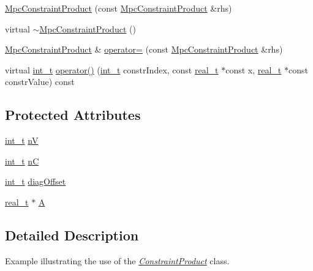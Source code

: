 \begin{DoxyCompactItemize}
\item 
\hyperlink{class_mpc_constraint_product_a8aa8f5b5c8945ef44399fa26f532883a}{Mpc\+Constraint\+Product} (const \hyperlink{class_mpc_constraint_product}{Mpc\+Constraint\+Product} \&rhs)
\item 
virtual \hyperlink{class_mpc_constraint_product_a39284cc529040c7d08638753206fc215}{$\sim$\+Mpc\+Constraint\+Product} ()
\item 
\hyperlink{class_mpc_constraint_product}{Mpc\+Constraint\+Product} \& \hyperlink{class_mpc_constraint_product_a9308d0ae70e3a791f9efcff0405f74e4}{operator=} (const \hyperlink{class_mpc_constraint_product}{Mpc\+Constraint\+Product} \&rhs)
\item 
virtual \hyperlink{_types_8hpp_ab6fd6105e64ed14a0c9281326f05e623}{int\+\_\+t} \hyperlink{class_mpc_constraint_product_af18c36ba5b5cf6c1c33b03d4bf37f8dc}{operator()} (\hyperlink{_types_8hpp_ab6fd6105e64ed14a0c9281326f05e623}{int\+\_\+t} constr\+Index, const \hyperlink{qp_o_a_s_e_s__wrapper_8h_a0d00e2b3dfadee81331bbb39068570c4}{real\+\_\+t} $\ast$const x, \hyperlink{qp_o_a_s_e_s__wrapper_8h_a0d00e2b3dfadee81331bbb39068570c4}{real\+\_\+t} $\ast$const constr\+Value) const
\end{DoxyCompactItemize}
\subsection*{Protected Attributes}
\begin{DoxyCompactItemize}
\item 
\hyperlink{_types_8hpp_ab6fd6105e64ed14a0c9281326f05e623}{int\+\_\+t} \hyperlink{class_mpc_constraint_product_a9ef5d7dbc63257619b9bd0ad947fe3cc}{nV}
\item 
\hyperlink{_types_8hpp_ab6fd6105e64ed14a0c9281326f05e623}{int\+\_\+t} \hyperlink{class_mpc_constraint_product_adcd49f3d8afb8b6011837e400b839cd9}{nC}
\item 
\hyperlink{_types_8hpp_ab6fd6105e64ed14a0c9281326f05e623}{int\+\_\+t} \hyperlink{class_mpc_constraint_product_a1a102bfd547fead3432356e8f57dad2d}{diag\+Offset}
\item 
\hyperlink{qp_o_a_s_e_s__wrapper_8h_a0d00e2b3dfadee81331bbb39068570c4}{real\+\_\+t} $\ast$ \hyperlink{class_mpc_constraint_product_ac647a2ac4e710288cf41d13f27fd7eed}{A}
\end{DoxyCompactItemize}


\subsection{Detailed Description}
Example illustrating the use of the {\itshape \hyperlink{class_constraint_product}{Constraint\+Product}} class. 

